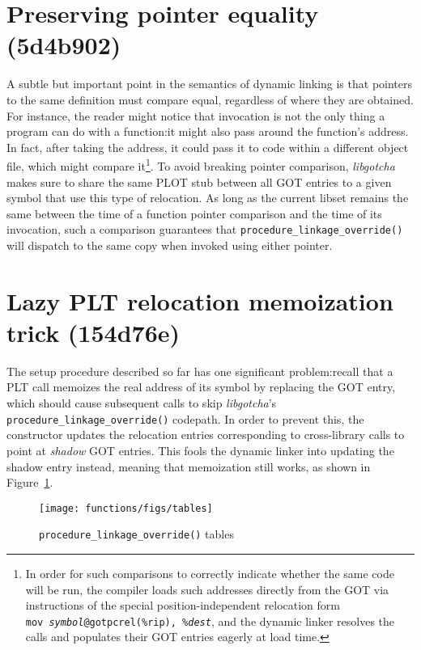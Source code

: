 \documentclass[12pt,letterpaper]{book}
\makeatletter
\let\includegraphics@\includegraphics
\renewcommand{\includegraphics}[2][]{\includegraphics@[#1]{\includegraphicsdir#2}}
\newcommand{\includegraphicsdir}{}
\makeatother
\begin{document}
\section{Preserving pointer equality (5d4b902)}

A subtle but important point in the semantics of dynamic linking is that pointers to
the same definition must compare equal, regardless of where they are obtained.  For
instance,
the reader might notice that invocation is not the only thing a program can do with a
function:\@ it might also pass around the function's address.  In fact, after taking
the address, it could pass it to code within a different object file, which might
compare it\footnote{In order for such comparisons to correctly indicate whether the
same code will be run, the compiler loads such addresses directly from the GOT via
instructions of the special position-independent relocation form
\texttt{mov~\textit{symbol}@gotpcrel(\%rip),~\%\textit{dest}}, and the dynamic linker
resolves the calls and populates their GOT entries eagerly at load time.}.  To avoid
breaking pointer comparison, \textit{libgotcha} makes sure to share the same PLOT
stub between all GOT entries to a given symbol that use this type of
relocation.  As long as the current libset remains the same between the time of a
function pointer comparison and the time of its invocation, such a comparison
guarantees that \texttt{procedure\_linkage\_override()} will dispatch to the same
copy when invoked using either pointer.


\section{Lazy PLT relocation memoization trick (154d76e)}

The setup procedure described so far has one significant problem:\@ recall that a PLT
call memoizes the real address of its symbol by replacing the GOT entry, which should
cause subsequent calls to skip \textit{libgotcha}'s \texttt{procedure\_linkage\_override()}
codepath.  In order to prevent this, the constructor updates the relocation entries
corresponding to cross-library calls to point at \textit{shadow} GOT entries.  This
fools the dynamic linker into updating the shadow entry instead, meaning that
memoization still works, as shown in Figure~\ref{fig:override}.

\begin{figure}
\texttt{[image: functions/figs/tables]}
\caption{\texttt{procedure\_linkage\_override()} tables}
\label{fig:override}
\end{figure}
\end{document}
